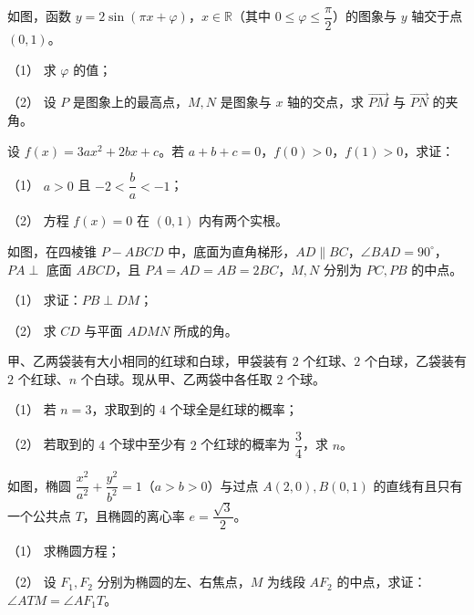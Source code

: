 \Needspace{0.4\textheight}
\begin{question}
如图，函数 $y=2\sin(\pi x+\varphi)$，$x\in\mathbb R$（其中 $0\leqslant\varphi\leqslant\dfrac{\pi}{2}$）的图象与 $y$ 轴交于点 $(0,1)$。

（1） 求 $\varphi$ 的值；

（2） 设 $P$ 是图象上的最高点，$M,N$ 是图象与 $x$ 轴的交点，求 $\overrightarrow{PM}$ 与 $\overrightarrow{PN}$ 的夹角。
\nopagebreak[4]
\begin{center}\end{center}
\nopagebreak[4]
\end{question}
\begin{question}
设 $f(x)=3ax^2+2bx+c$。若 $a+b+c=0$，$f(0)>0$，$f(1)>0$，求证：

（1） $a>0$ 且 $-2<\dfrac ba<-1$；

（2） 方程 $f(x)=0$ 在 $(0,1)$ 内有两个实根。

\Needspace{0.4\textheight}
\end{question}
\begin{question}
如图，在四棱锥 $P-ABCD$ 中，底面为直角梯形，$AD\parallel BC$，$\angle BAD=90^\circ$，$PA\perp$ 底面 $ABCD$，且 $PA=AD=AB=2BC$，$M,N$ 分别为 $PC,PB$ 的中点。

（1） 求证：$PB\perp DM$；

（2） 求 $CD$ 与平面 $ADMN$ 所成的角。
\nopagebreak[4]
\begin{center}\end{center}
\nopagebreak[4]
\end{question}
\begin{question}
甲、乙两袋装有大小相同的红球和白球，甲袋装有 $2$ 个红球、$2$ 个白球，乙袋装有 $2$ 个红球、$n$ 个白球。现从甲、乙两袋中各任取 $2$ 个球。

（1） 若 $n=3$，求取到的 $4$ 个球全是红球的概率；

（2） 若取到的 $4$ 个球中至少有 $2$ 个红球的概率为 $\dfrac34$，求 $n$。

\Needspace{0.4\textheight}
\end{question}
\begin{question}
如图，椭圆 $\dfrac{x^2}{a^2}+\dfrac{y^2}{b^2}=1$（$a>b>0$）与过点 $A(2,0),B(0,1)$ 的直线有且只有一个公共点 $T$，且椭圆的离心率 $e=\dfrac{\sqrt3}{2}$。

（1） 求椭圆方程；

（2） 设 $F_1,F_2$ 分别为椭圆的左、右焦点，$M$ 为线段 $AF_2$ 的中点，求证：$\angle ATM=\angle AF_1T$。
\nopagebreak[4]
\begin{center}\end{center}
\nopagebreak[4]
\Needspace{0.4\textheight}
\end{question}
